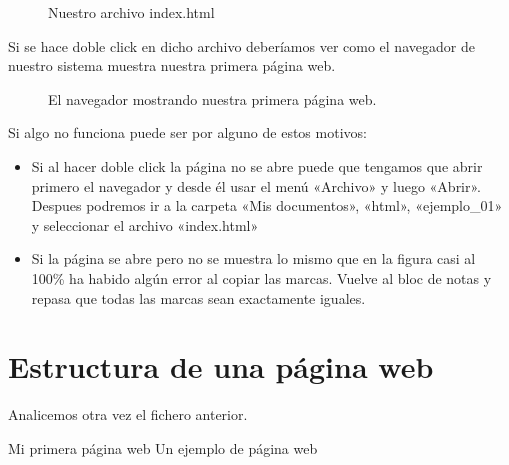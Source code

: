 \documentclass[a4paper,12pt,spanish]{sphinxmanual}
\begin{document}
\begin{figure}[htbp]
\centering
\capstart

\noindent{}
\caption{Nuestro archivo index.html}\label{\detokenize{index:id7}}\end{figure}

Si se hace doble click en dicho archivo deberíamos ver como el navegador de nuestro sistema muestra nuestra primera página web.

\begin{figure}[htbp]
\centering
\capstart

\noindent{}
\caption{El navegador mostrando nuestra primera página web.}\label{\detokenize{index:id8}}\end{figure}

Si algo no funciona puede ser por alguno de estos motivos:
\begin{itemize}
\item {} 
Si al hacer doble click la página no se abre puede que tengamos que abrir primero el navegador y desde él usar el menú «Archivo» y luego «Abrir». Despues podremos ir a la carpeta «Mis documentos», «html», «ejemplo\_01» y seleccionar el archivo «index.html»

\item {} 
Si la página se abre pero no se muestra lo mismo que en la figura casi al 100\% ha habido algún error al copiar las marcas. Vuelve al bloc de notas y repasa que todas las marcas sean exactamente iguales.

\end{itemize}


\chapter{Estructura de una página web}
\label{\detokenize{index:estructura-de-una-pagina-web}}
Analicemos otra vez el fichero anterior.

%
\begin{sphinxVerbatim}[commandchars=\\\{\}]
         Mi primera página web
     Un ejemplo de página web
\end{sphinxVerbatim}
\end{document}
